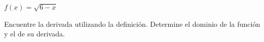 \item $f(x) = \sqrt{6 - x}$
\par
Encuentre la derivada utilizando la definición. Determine el dominio de la función y el de su derivada.
